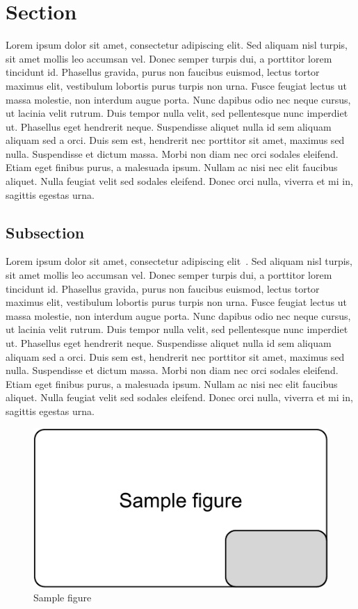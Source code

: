 \documentclass[10pt,sigconf,anonymous]{acmart}
\begin{document}
\section{Section}

Lorem ipsum dolor sit amet, consectetur adipiscing elit.
Sed aliquam nisl turpis, sit amet mollis leo accumsan vel.
Donec semper turpis dui, a porttitor lorem tincidunt id.
Phasellus gravida, purus non faucibus euismod, lectus tortor maximus elit, vestibulum lobortis purus turpis non urna.
Fusce feugiat lectus ut massa molestie, non interdum augue porta.
Nunc dapibus odio nec neque cursus, ut lacinia velit rutrum.
Duis tempor nulla velit, sed pellentesque nunc imperdiet ut.
Phasellus eget hendrerit neque.
Suspendisse aliquet nulla id sem aliquam aliquam sed a orci.
Duis sem est, hendrerit nec porttitor sit amet, maximus sed nulla.
Suspendisse et dictum massa.
Morbi non diam nec orci sodales eleifend.
Etiam eget finibus purus, a malesuada ipsum.
Nullam ac nisi nec elit faucibus aliquet.
Nulla feugiat velit sed sodales eleifend.
Donec orci nulla, viverra et mi in, sagittis egestas urna.

\subsection{Subsection}

Lorem ipsum dolor sit amet, consectetur adipiscing elit~\cite{veytsmanlatex}.
Sed aliquam nisl turpis, sit amet mollis leo accumsan vel.
Donec semper turpis dui, a porttitor lorem tincidunt id.
Phasellus gravida, purus non faucibus euismod, lectus tortor maximus elit, vestibulum lobortis purus turpis non urna.
Fusce feugiat lectus ut massa molestie, non interdum augue porta.
Nunc dapibus odio nec neque cursus, ut lacinia velit rutrum.
Duis tempor nulla velit, sed pellentesque nunc imperdiet ut.
Phasellus eget hendrerit neque.
Suspendisse aliquet nulla id sem aliquam aliquam sed a orci.
Duis sem est, hendrerit nec porttitor sit amet, maximus sed nulla.
Suspendisse et dictum massa.
Morbi non diam nec orci sodales eleifend.
Etiam eget finibus purus, a malesuada ipsum.
Nullam ac nisi nec elit faucibus aliquet.
Nulla feugiat velit sed sodales eleifend.
Donec orci nulla, viverra et mi in, sagittis egestas urna.

\begin{figure}[htbp]
  \centering
  \includegraphics[scale=0.5]{sample-figure}
  \caption{Sample figure}
  \label{fig:sample}
\end{figure}
\end{document}
